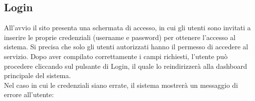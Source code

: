 \subsection{Login}

All'avvio il sito presenta una schermata di accesso, in cui gli utenti sono invitati a inserire le proprie credenziali (username e password) per ottenere l'accesso al sistema. Si precisa che solo gli utenti autorizzati hanno il permesso di accedere al servizio. Dopo aver compilato correttamente i campi richiesti, l'utente può procedere cliccando sul pulsante di Login, il quale lo reindirizzerà alla dashboard principale del sistema.\\
Nel caso in cui le credenziali siano errate, il sistema mostrerà un messaggio di errore all’utente:

